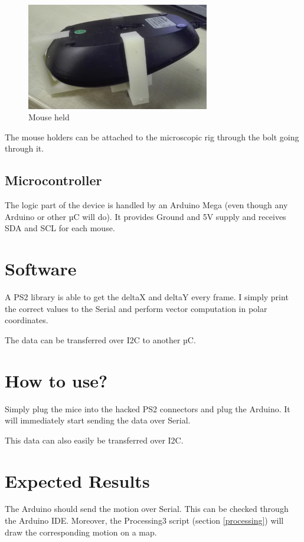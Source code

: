 \documentclass[a4paper]{article}
\begin{document}
\begin{figure}[h!]
    \centering
    \includegraphics[width = 8cm]{images/cad3.jpg}
    \caption{Mouse held}
    \label{fig:cad3}
\end{figure}

The mouse holders can be attached to the microscopic rig through the bolt going through it.

\subsection{Microcontroller}
The logic part of the device is handled by an Arduino Mega (even though any Arduino or other µC will do). It provides Ground and 5V supply and receives SDA and SCL for each mouse.

\section{Software}
A PS2 library is able to get the deltaX and deltaY every frame. I simply print the correct values to the Serial and perform vector computation in polar coordinates.

The data can be transferred over I2C to another µC.

\section{How to use?}
Simply plug the mice into the hacked PS2 connectors and plug the Arduino. It will immediately start sending the data over Serial.

This data can also easily be transferred over I2C.

\section{Expected Results}
The Arduino should send the motion over Serial. This can be checked through the Arduino IDE. Moreover, the Processing3 script (section \ref{processing}) will draw the corresponding motion on a map.
\end{document}
